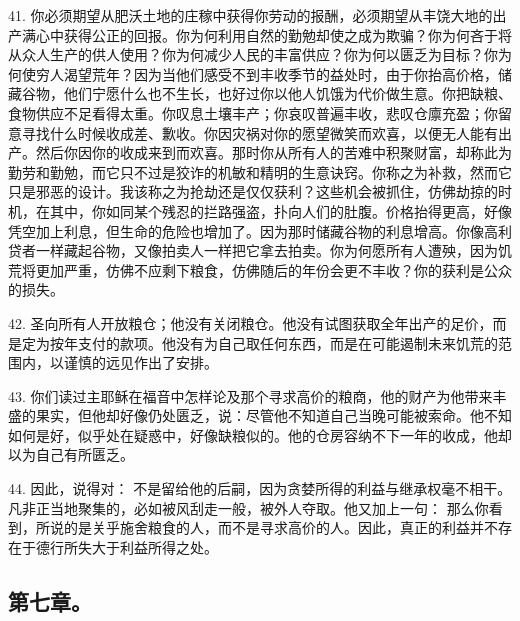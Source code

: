 41. 你必须期望从肥沃土地的庄稼中获得你劳动的报酬，必须期望从丰饶大地的出产满心中获得公正的回报。你为何利用自然的勤勉却使之成为欺骗？你为何吝于将从众人生产的供人使用？你为何减少人民的丰富供应？你为何以匮乏为目标？你为何使穷人渴望荒年？因为当他们感受不到丰收季节的益处时，由于你抬高价格，储藏谷物，他们宁愿什么也不生长，也好过你以他人饥饿为代价做生意。你把缺粮、食物供应不足看得太重。你叹息土壤丰产；你哀叹普遍丰收，悲叹仓廪充盈；你留意寻找什么时候收成差、歉收。你因灾祸对你的愿望微笑而欢喜，以便无人能有出产。然后你因你的收成来到而欢喜。那时你从所有人的苦难中积聚财富，却称此为勤劳和勤勉，而它只不过是狡诈的机敏和精明的生意诀窍。你称之为补救，然而它只是邪恶的设计。我该称之为抢劫还是仅仅获利？这些机会被抓住，仿佛劫掠的时机，在其中，你如同某个残忍的拦路强盗，扑向人们的肚腹。价格抬得更高，好像凭空加上利息，但生命的危险也增加了。因为那时储藏谷物的利息增高。你像高利贷者一样藏起谷物，又像拍卖人一样把它拿去拍卖。你为何愿所有人遭殃，因为饥荒将更加严重，仿佛不应剩下粮食，仿佛随后的年份会更不丰收？你的获利是公众的损失。\par

42. 圣向所有人开放粮仓；他没有关闭粮仓。他没有试图获取全年出产的足价，而是定为按年支付的款项。他没有为自己取任何东西，而是在可能遏制未来饥荒的范围内，以谨慎的远见作出了安排。\par

43. 你们读过主耶稣在福音中怎样论及那个寻求高价的粮商，他的财产为他带来丰盛的果实，但他却好像仍处匮乏，说：尽管他不知道自己当晚可能被索命。他不知如何是好，似乎处在疑惑中，好像缺粮似的。他的仓房容纳不下一年的收成，他却以为自己有所匮乏。\par

44. 因此，说得对： 不是留给他的后嗣，因为贪婪所得的利益与继承权毫不相干。凡非正当地聚集的，必如被风刮走一般，被外人夺取。他又加上一句： 那么你看到，所说的是关乎施舍粮食的人，而不是寻求高价的人。因此，真正的利益并不存在于德行所失大于利益所得之处。\par


\subsection{第七章。}

